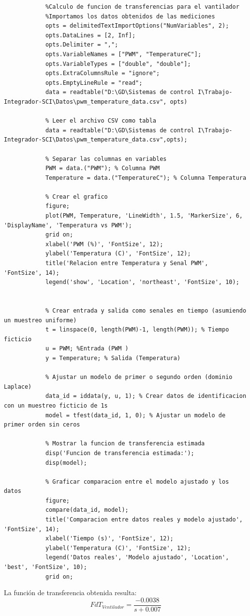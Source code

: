 \documentclass[12pt]{article}
\begin{document}
		\begin{lstlisting}
			%Calculo de funcion de transferencias para el vantilador
			%Importamos los datos obtenidos de las mediciones
			opts = delimitedTextImportOptions("NumVariables", 2);
			opts.DataLines = [2, Inf];
			opts.Delimiter = ",";
			opts.VariableNames = ["PWM", "TemperatureC"];
			opts.VariableTypes = ["double", "double"];
			opts.ExtraColumnsRule = "ignore";
			opts.EmptyLineRule = "read";
			data = readtable("D:\GD\Sistemas de control I\Trabajo-Integrador-SCI\Datos\pwm_temperature_data.csv", opts)
			
			% Leer el archivo CSV como tabla
			data = readtable("D:\GD\Sistemas de control I\Trabajo-Integrador-SCI\Datos\pwm_temperature_data.csv",opts);
			
			% Separar las columnas en variables
			PWM = data.("PWM"); % Columna PWM
			Temperature = data.("TemperatureC"); % Columna Temperatura
			
			% Crear el grafico
			figure;
			plot(PWM, Temperature, 'LineWidth', 1.5, 'MarkerSize', 6, 'DisplayName', 'Temperatura vs PWM');
			grid on;
			xlabel('PWM (%)', 'FontSize', 12);
			ylabel('Temperatura (C)', 'FontSize', 12);
			title('Relacion entre Temperatura y Senal PWM', 'FontSize', 14);
			legend('show', 'Location', 'northeast', 'FontSize', 10);
			
			
			% Crear entrada y salida como senales en tiempo (asumiendo un muestreo uniforme)
			t = linspace(0, length(PWM)-1, length(PWM)); % Tiempo ficticio
			u = PWM; %Entrada (PWM )
			y = Temperature; % Salida (Temperatura)
			
			% Ajustar un modelo de primer o segundo orden (dominio Laplace)
			data_id = iddata(y, u, 1); % Crear datos de identificacion con un muestreo ficticio de 1s
			model = tfest(data_id, 1, 0); % Ajustar un modelo de primer orden sin ceros
			
			% Mostrar la funcion de transferencia estimada
			disp('Funcion de transferencia estimada:');
			disp(model);
			
			% Graficar comparacion entre el modelo ajustado y los datos
			figure;
			compare(data_id, model);
			title('Comparacion entre datos reales y modelo ajustado', 'FontSize', 14);
			xlabel('Tiempo (s)', 'FontSize', 12);
			ylabel('Temperatura (C)', 'FontSize', 12);
			legend('Datos reales', 'Modelo ajustado', 'Location', 'best', 'FontSize', 10);
			grid on;
		\end{lstlisting}
		
		La función de transferencia obtenida resulta:
		\begin{equation}
			FdT_{Ventilador}=\frac{-0.0038}{s+0.007}
		\end{equation}
		
\end{document}

